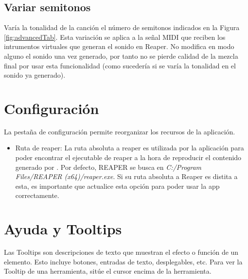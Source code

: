 \subsection{Variar semitonos}
Varía la tonalidad de la canción el número de semitonos indicados en la Figura \ref{fig:advancedTab}. Esta variación se aplica a la señal MIDI que reciben los intrumentos virtuales que generan el sonido en Reaper. No modifica en modo alguno el sonido una vez generado, por tanto no se pierde calidad de la mezcla final por usar esta funcionalidad (como sucedería si se varía la tonalidad en el sonido ya generado).

\section{Configuración}
\label{sec:app:conFiguration}

La pestaña de configuración permite reorganizar los recursos de la aplicación.

\begin{itemize}
    \item Ruta de reaper: La ruta absoluta a reaper es utilizada por la aplicación para poder encontrar el ejecutable de reaper a la hora de reproducir el contenido generado por \appName{}. Por defecto, REAPER se busca en \textit{C:/Program Files/REAPER (x64)/reaper.exe}. Si su ruta absoluta a Reaper es distita a esta, es importante que actualice esta opción para poder usar la app correctamente.
\end{itemize}

\section{Ayuda y Tooltips}

Las Tooltips son descripciones de texto que muestran el efecto o función de un elemento. Esto incluye botones, entradas de texto, desplegables, etc. Para ver la Tooltip de una herramienta, sitúe el cursor encima de la herramienta.